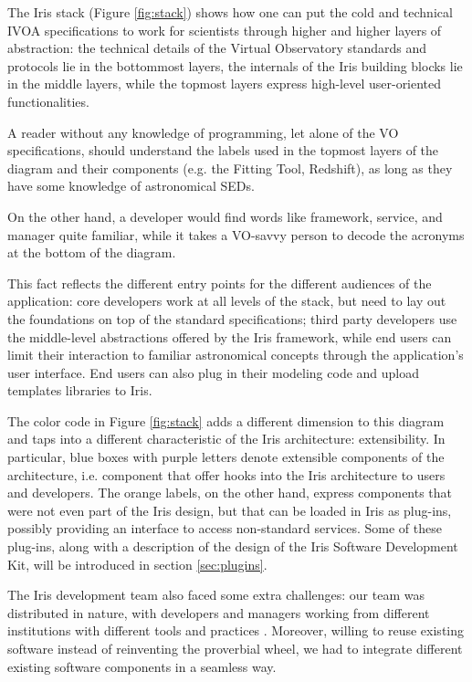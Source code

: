 \documentclass[preprint,12pt,3p]{elsarticle}
\begin{document}
The Iris stack (Figure \ref{fig:stack}) shows how one can put the cold and technical IVOA specifications to work for scientists through higher and higher layers of abstraction: the technical details of the Virtual Observatory standards and protocols lie in the bottommost layers, the internals of the Iris building blocks lie in the middle layers, while the topmost layers express high-level user-oriented functionalities.

A reader without any knowledge of programming, let alone of the VO specifications, should understand the labels used in the topmost layers of the diagram and their components (e.g. the Fitting Tool, Redshift), as long as they have some knowledge of astronomical SEDs.

On the other hand, a developer would find words like framework, service, and manager quite familiar, while it takes a VO-savvy person to decode the acronyms at the bottom of the diagram.

This fact reflects the different entry points for the different audiences of the application: core developers work at all levels of the stack, but need to lay out the foundations on top of the standard specifications; third party developers use the middle-level abstractions offered by the Iris framework, while end users can limit their interaction to familiar astronomical concepts through the application's user interface. End users can also plug in their modeling code and upload templates libraries to Iris.

The color code in Figure \ref{fig:stack} adds a different dimension to this diagram and taps into a different characteristic of the Iris architecture: extensibility. In particular, blue boxes with purple letters denote extensible components of the architecture, i.e. component that offer hooks into the Iris architecture to users and developers. The orange labels, on the other hand, express components that were not even part of the Iris design, but that can be loaded in Iris as plug-ins, possibly providing an interface to access non-standard services. Some of these plug-ins, along with a description of the design of the Iris Software Development Kit, will be introduced in section \ref{sec:plugins}.

The Iris development team also faced some extra challenges: our team was distributed in nature, with developers and managers working from different institutions with different tools and practices \citep{2012SPIE.8449E..0IE}. Moreover, willing to reuse existing software instead of reinventing the proverbial wheel, we had to integrate different existing software components in a seamless way.
\end{document}
